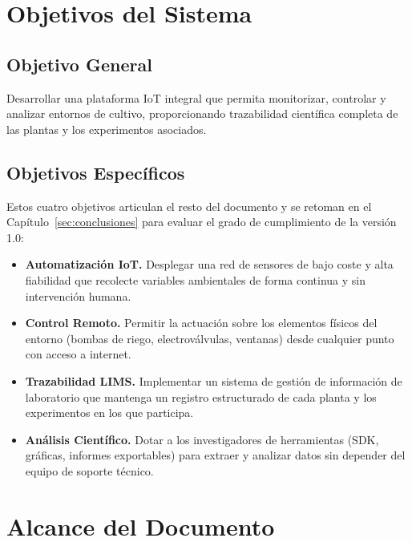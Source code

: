 \section{Objetivos del Sistema}

\subsection{Objetivo General}
Desarrollar una plataforma IoT integral que permita monitorizar, controlar y
analizar entornos de cultivo, proporcionando trazabilidad científica completa
de las plantas y los experimentos asociados.

\subsection{Objetivos Específicos}

Estos cuatro objetivos articulan el resto del documento y se retoman en el
Capítulo~\ref{sec:conclusiones} para evaluar el grado de cumplimiento de
la versión 1.0:

\begin{itemize}[leftmargin=*, label=--]
    \item \textbf{Automatización IoT.} Desplegar una red de sensores de bajo
          coste y alta fiabilidad que recolecte variables ambientales de
          forma continua y sin intervención humana.
    \item \textbf{Control Remoto.} Permitir la actuación sobre los elementos
          físicos del entorno (bombas de riego, electroválvulas, ventanas)
          desde cualquier punto con acceso a internet.
    \item \textbf{Trazabilidad LIMS.} Implementar un sistema de gestión de
          información de laboratorio que mantenga un registro estructurado
          de cada planta y los experimentos en los que participa.
    \item \textbf{Análisis Científico.} Dotar a los investigadores de
          herramientas (SDK, gráficas, informes exportables) para extraer y
          analizar datos sin depender del equipo de soporte técnico.
\end{itemize}

\section{Alcance del Documento}

